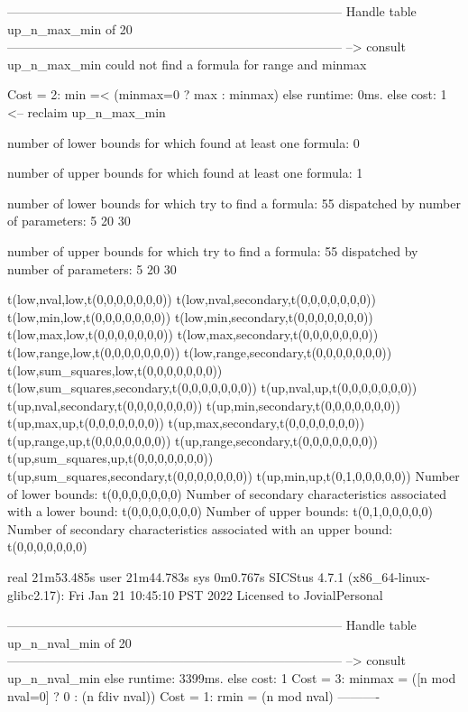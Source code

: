 --------------------------------------------------------------------------------
Handle table up_n_max_min of 20
--------------------------------------------------------------------------------
--> consult up_n_max_min
could not find a formula for range and minmax

Cost =  2:  min =< (minmax=0 ? max : minmax)
else runtime: 0ms. else cost: 1
<-- reclaim up_n_max_min

number of lower bounds for which found at least one formula: 0

number of upper bounds for which found at least one formula: 1

number of lower bounds for which try to find a formula: 55
dispatched by number of parameters: 5  20  30

number of upper bounds for which try to find a formula: 55
dispatched by number of parameters: 5  20  30

t(low,nval,low,t(0,0,0,0,0,0,0))
t(low,nval,secondary,t(0,0,0,0,0,0,0))
t(low,min,low,t(0,0,0,0,0,0,0))
t(low,min,secondary,t(0,0,0,0,0,0,0))
t(low,max,low,t(0,0,0,0,0,0,0))
t(low,max,secondary,t(0,0,0,0,0,0,0))
t(low,range,low,t(0,0,0,0,0,0,0))
t(low,range,secondary,t(0,0,0,0,0,0,0))
t(low,sum_squares,low,t(0,0,0,0,0,0,0))
t(low,sum_squares,secondary,t(0,0,0,0,0,0,0))
t(up,nval,up,t(0,0,0,0,0,0,0))
t(up,nval,secondary,t(0,0,0,0,0,0,0))
t(up,min,secondary,t(0,0,0,0,0,0,0))
t(up,max,up,t(0,0,0,0,0,0,0))
t(up,max,secondary,t(0,0,0,0,0,0,0))
t(up,range,up,t(0,0,0,0,0,0,0))
t(up,range,secondary,t(0,0,0,0,0,0,0))
t(up,sum_squares,up,t(0,0,0,0,0,0,0))
t(up,sum_squares,secondary,t(0,0,0,0,0,0,0))
t(up,min,up,t(0,1,0,0,0,0,0))
Number of lower bounds:                                             t(0,0,0,0,0,0,0)
Number of secondary characteristics associated with a lower bound:  t(0,0,0,0,0,0,0)
Number of upper bounds:                                             t(0,1,0,0,0,0,0)
Number of secondary characteristics associated with an upper bound: t(0,0,0,0,0,0,0)

real	21m53.485s
user	21m44.783s
sys	0m0.767s
SICStus 4.7.1 (x86_64-linux-glibc2.17): Fri Jan 21 10:45:10 PST 2022
Licensed to JovialPersonal


--------------------------------------------------------------------------------
Handle table up_n_nval_min of 20
--------------------------------------------------------------------------------
--> consult up_n_nval_min
else runtime: 3399ms. else cost: 1
Cost =  3:  minmax = ([n mod nval=0] ? 0 : (n fdiv nval)) %
Cost =  1:  rmin   = (n mod nval)
----------

